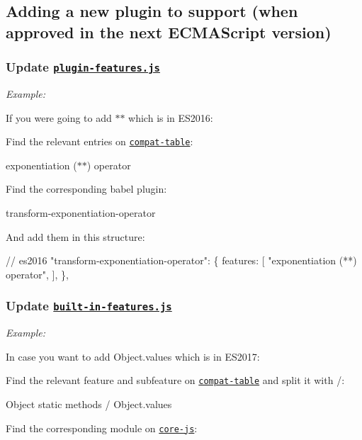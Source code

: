 \subsection*{Adding a new plugin to support (when approved in the next E\+C\+M\+A\+Script version)}

\subsubsection*{Update \href{https://github.com/babel/babel-preset-env/blob/master/data/plugin-features.js}{\tt {\ttfamily plugin-\/features.\+js}}}

{\itshape Example\+:}

If you were going to add {\ttfamily $\ast$$\ast$} which is in E\+S2016\+:

Find the relevant entries on \href{https://kangax.github.io/compat-table/es2016plus/#test-exponentiation_(**)_operator}{\tt compat-\/table}\+:

{\ttfamily exponentiation ($\ast$$\ast$) operator}

Find the corresponding babel plugin\+:

{\ttfamily transform-\/exponentiation-\/operator}

And add them in this structure\+:


\begin{DoxyCode}
// es2016
"transform-exponentiation-operator": \{
  features: [
    "exponentiation (**) operator",
  ],
\},
\end{DoxyCode}


\subsubsection*{Update \href{https://github.com/babel/babel-preset-env/blob/master/data/built-in-features.js}{\tt {\ttfamily built-\/in-\/features.\+js}}}

{\itshape Example\+:}

In case you want to add {\ttfamily Object.\+values} which is in E\+S2017\+:

Find the relevant feature and subfeature on \href{https://kangax.github.io/compat-table/es2016plus/#test-Object_static_methods_Object.values}{\tt compat-\/table} and split it with {\ttfamily /}\+:

{\ttfamily Object static methods / Object.\+values}

Find the corresponding module on \href{https://github.com/zloirock/core-js/tree/master/modules}{\tt core-\/js}\+:

